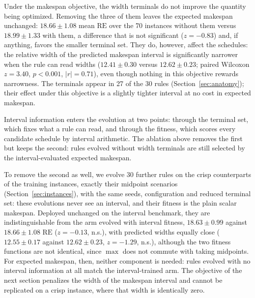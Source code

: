 \documentclass[review,authoryear,11pt]{elsarticle}
\newcommand{\RE}{\mathrm{RE}}
\begin{document}
Under the makespan objective, the width terminals do not improve the
quantity being optimized. Removing the three of them leaves the
expected makespan unchanged: $18.66 \pm 1.08$ mean $\RE$ over the 70
instances without them versus $18.99 \pm 1.33$ with them, a difference
that is not significant ($z=-0.83$) and, if anything, favors the smaller
terminal set. They do, however, affect the schedules: the relative
width of the predicted makespan interval is significantly narrower when
the rule can read widths ($12.41 \pm 0.30$ versus $12.62 \pm 0.23$;
paired Wilcoxon $z=3.40$, $p<0.001$, $|r|=0.71$), even though nothing in this
objective rewards narrowness. The terminals appear in 27 of the 30
rules (Section~\ref{sec:anatomy}); their effect under this objective is
a slightly tighter interval at no cost in expected makespan.

Interval information enters the evolution at two points: through the
terminal set, which fixes what a rule can read, and through the
fitness, which scores every candidate schedule by interval arithmetic.
The ablation above removes the first but keeps the second: rules
evolved without width terminals are still selected by the
interval-evaluated expected makespan.

To remove the second as well, we evolve 30 further rules on the crisp
counterparts of the training instances, exactly their midpoint
scenarios (Section~\ref{sec:instances}), with the same seeds,
configuration and reduced terminal set: these evolutions never see an
interval, and their fitness is the plain scalar makespan. Deployed
unchanged on the interval benchmark, they are indistinguishable from
the arm evolved with interval fitness, $18.63 \pm 0.99$ against
$18.66 \pm 1.08$ $\RE$ ($z=-0.13$, n.s.), with predicted widths
equally close ($12.55 \pm 0.17$ against $12.62 \pm 0.23$, $z=-1.29$,
n.s.), although the two fitness functions are not identical, since
$\max$ does not commute with taking midpoints. For expected makespan,
then, neither component is needed: rules evolved with no interval
information at all match the interval-trained arm. The objective of the
next section penalizes the width of the makespan interval and cannot be
replicated on a crisp instance, where that width is identically zero.
\end{document}
